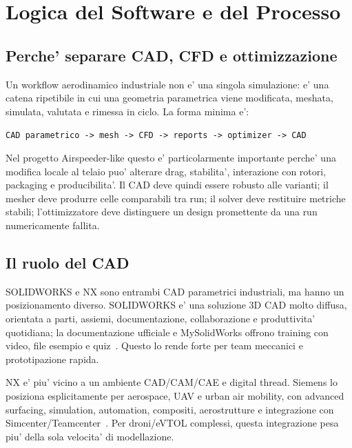 
\chapter{Logica del Software e del Processo}
\label{cap:software-logic}

\section{Perche' separare CAD, CFD e ottimizzazione}

Un workflow aerodinamico industriale non e' una singola simulazione: e' una catena ripetibile in cui una geometria parametrica viene modificata, meshata, simulata, valutata e rimessa in ciclo. La forma minima e':

\begin{center}
\texttt{CAD parametrico -> mesh -> CFD -> reports -> optimizer -> CAD}
\end{center}

Nel progetto Airspeeder-like questo e' particolarmente importante perche' una modifica locale al telaio puo' alterare drag, stabilita', interazione con rotori, packaging e producibilita'. Il CAD deve quindi essere robusto alle varianti; il mesher deve produrre celle comparabili tra run; il solver deve restituire metriche stabili; l'ottimizzatore deve distinguere un design promettente da una run numericamente fallita.

\section{Il ruolo del CAD}

SOLIDWORKS e NX sono entrambi CAD parametrici industriali, ma hanno un posizionamento diverso. SOLIDWORKS e' una soluzione 3D CAD molto diffusa, orientata a parti, assiemi, documentazione, collaborazione e produttivita' quotidiana; la documentazione ufficiale e MySolidWorks offrono training con video, file esempio e quiz~\cite{solidworks_design,solidworks_help}. Questo lo rende forte per team meccanici e prototipazione rapida.

NX e' piu' vicino a un ambiente CAD/CAM/CAE e digital thread. Siemens lo posiziona esplicitamente per aerospace, UAV e urban air mobility, con advanced surfacing, simulation, automation, compositi, aerostrutture e integrazione con Simcenter/Teamcenter~\cite{nx_cad,nx_aerospace,nx_interop}. Per droni/eVTOL complessi, questa integrazione pesa piu' della sola velocita' di modellazione.

